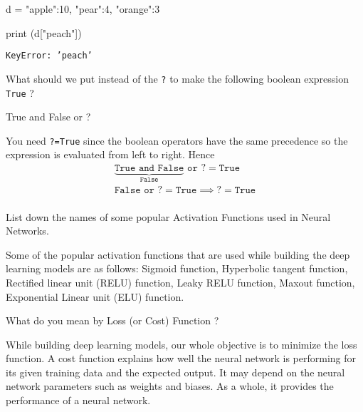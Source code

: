 \documentclass[12pt,a4paper]{exam}
\begin{document}
\begin{ipython}
d = {"apple":10, "pear":4, "orange":3}

print (d["peach"])
\end{ipython}
\makeemptybox{3cm}
\begin{solution}
\texttt{KeyError: 'peach'}
\end{solution}
\question
What should we put instead of the \texttt{?} to make the following boolean expression \texttt{True} ?
\begin{ipython}
True and False or ?
\end{ipython}
\fillwithlines{3cm}
\begin{solution}
You need \texttt{?=True} since the boolean operators have the same precedence so the expression is evaluated from left to right.
Hence
\begin{equation*}
  \begin{gathered}
    \underbrace{\texttt{True and False}}_{\texttt{False}}\texttt{ or ?} = \texttt{True} \\
    \texttt{False or ?} = \texttt{True} \implies \texttt{?} = \texttt{True} \\
    \end{gathered}
\end{equation*}
\end{solution}


\question
List down the names of some popular Activation Functions used in Neural Networks.
\fillwithlines{3cm}
\begin{solution}
Some of the popular activation functions that are used while building the deep learning models are as follows:
Sigmoid function, Hyperbolic tangent function, Rectified linear unit (RELU) function, Leaky RELU function, Maxout function, Exponential Linear unit (ELU) function.
\end{solution}


\question
What do you mean by Loss (or Cost) Function ?
\fillwithlines{3cm}
\begin{solution}
While building deep learning models, our whole objective is to minimize the loss function.
A cost function explains how well the neural network is performing for its given training data and the expected output.
It may depend on the neural network parameters such as weights and biases. As a whole, it provides the performance of a neural network.
\end{solution}
\end{document}
